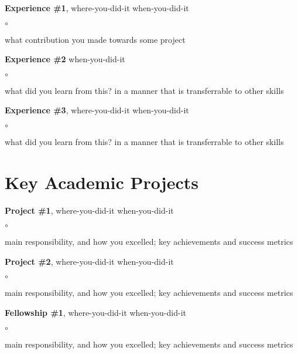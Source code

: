 \documentclass[margin,line]{res}
\newenvironment{list2}{
  \begin{list}{$\circ$}{%
      \setlength{\itemsep}{0in}
      \setlength{\parsep}{0in} \setlength{\parskip}{0in}
      \setlength{\topsep}{0in} \setlength{\partopsep}{0in} 
      \setlength{\leftmargin}{0.25in}}}{\end{list}}
\begin{document}
\begin{resume}
{\bf Experience \#1}, {\sf where-you-did-it} \hfill {when-you-did-it}

\begin{list2}
\item what contribution you made towards \textsf{some project}
\end{list2}

\vspace*{-.15in}
{\bf Experience \#2} \hfill {when-you-did-it}

\begin{list2}
\item what did you learn from this? in a manner that is transferrable to other skills 
\end{list2}

\vspace*{-.15in}
{\bf Experience \#3}, {\sf where-you-did-it} \hfill {when-you-did-it}

\begin{list2}
\item what did you learn from this? in a manner that is transferrable to other skills 
\end{list2}

\vspace*{-0.1in}
\section{\sc Key Academic Projects} 

{\bf Project \#1}, {\sf where-you-did-it} \hfill {when-you-did-it}

\begin{list2}
\item main responsibility, and how you excelled; key achievements and success metrics
\end{list2}

\vspace*{-.15in}
{\bf Project \#2}, {\sf where-you-did-it} \hfill {when-you-did-it}

\begin{list2}
\item main responsibility, and how you excelled; key achievements and success metrics

\end{list2}

\vspace*{-.15in}
{\bf Fellowship \#1}, {\sf where-you-did-it} \hfill {when-you-did-it}

\begin{list2}
\item main responsibility, and how you excelled; key achievements and success metrics
\end{list2}


\end{resume}
\end{document}
